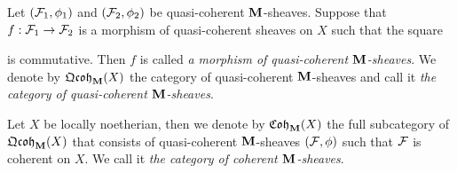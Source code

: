 \begin{definition}
Let $({\mathcal F}_1,\phi_1)$ and $({\mathcal F}_2,\phi_2)$ be quasi-coherent $\mathbf{M}$-sheaves. Suppose that $f:{\mathcal F}_1\rightarrow {\mathcal F}_2$ is a morphism of quasi-coherent sheaves on $X$ such that the square
\begin{center}
\end{center}
is commutative. Then $f$ is called \textit{a morphism of quasi-coherent $\mathbf{M}$-sheaves}. We denote by $\mathfrak{Qcoh}_{\mathbf{M}}(X)$ the category of quasi-coherent $\mathbf{M}$-sheaves and call it \textit{the category of quasi-coherent $\mathbf{M}$-sheaves}.
\end{definition}

\begin{definition}
Let $X$ be locally noetherian, then we denote by $\mathfrak{Coh}_{\mathbf{M}}(X)$ the full subcategory of $\mathfrak{Qcoh}_{\mathbf{M}}(X)$ that consists of quasi-coherent $\mathbf{M}$-sheaves $({\mathcal F},\phi)$ such that ${\mathcal F}$ is coherent on $X$. We call it \textit{the category of coherent $\mathbf{M}$-sheaves}.
\end{definition}

